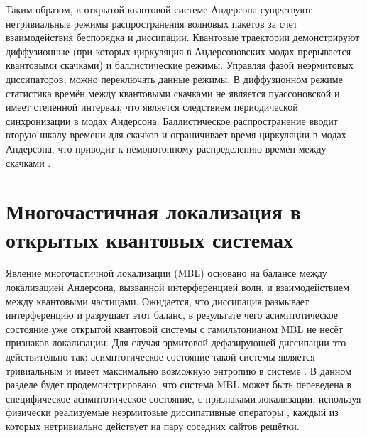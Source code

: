 Таким образом, в открытой квантовой системе Андерсона существуют нетривиальные режимы распространения волновых пакетов за счёт взаимодействия беспорядка и диссипации. Квантовые траектории демонстрируют диффузионные (при которых циркуляция в Андерсоновских модах прерывается квантовыми скачками) и баллистические режимы. Управляя фазой неэрмитовых диссипаторов, можно переключать данные режимы. В диффузионном режиме статистика времён между квантовыми скачками не является пуассоновской и имеет степенной интервал, что является следствием периодической синхронизации в модах Андерсона. Баллистическое распространение вводит вторую шкалу времени для скачков и ограничивает время циркуляции в модах Андерсона, что приводит к немонотонному распределению времён между скачками \cite{Yusipov2018}.

\section{Многочастичная локализация в открытых квантовых системах}\label{sec:ch1/prb_mbl}
Явление многочастичной локализации (MBL) основано на балансе между локализацией Андерсона, вызванной интерференцией волн, и взаимодействием между квантовыми частицами. Ожидается, что диссипация размывает интерференцию и разрушает этот баланс, в результате чего асимптотическое состояние уже открытой квантовой системы с гамильтонианом MBL не несёт признаков локализации. Для случая эрмитовой дефазирующей диссипации это действительно так: асимптотическое состояние такой системы является тривиальным и имеет максимально возможную энтропию в системе \cite{Levi2016, Fischer2016, Medvedyeva2016}. В данном разделе будет продемонстрировано, что система MBL может быть переведена в специфическое асимптотическое состояние, с признаками локализации, используя физически реализуемые неэрмитовые диссипативные операторы \cite{Diehl2008}, каждый из которых нетривиально действует на пару соседних сайтов решётки.

